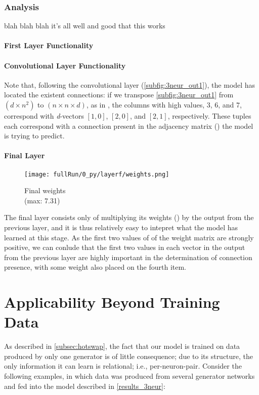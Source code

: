 \subsubsection{Analysis}
blah blah blah it's all well and good that this works

\paragraph{First Layer Functionality}

\paragraph{Convolutional Layer Functionality}

Note that, following the convolutional layer (\ref{subfig:3neur_out1}), the 
model has located the existent connections: if we transpose 
\ref{subfig:3neur_out1} from $(d \times n^2)$ to $(n \times n \times d)$, as in 
, the columns with high values, 3, 6, and 7, correspond 
with \textit{d}-vectors $[1,0]$, $[2,0]$, and $[2,1]$, respectively. These 
tuples each correspond with a connection present in the adjacency matrix 
() the model is trying to predict. 

\paragraph{Final Layer}
\begin{wrapfigure}[5]{r}{.25\textwidth}
	\centering
	\vspace{-15pt}
	\texttt{[image: fullRun/0\_py/layerf/weights.png]}
	\caption{Final weights\\(max: 7.31)}
	\label{fig:3neur_flayer}
\end{wrapfigure}
The final layer consists only of multiplying its weights 
() by the output from the previous layer, and it is 
thus relatively easy to intepret what the model has learned at this stage. As 
the first two values of of the weight matrix are strongly positive, we can 
conlude that the first two values in each vector in the output from the previous 
layer are highly important in the determination of connection presence, with 
some weight also placed on the fourth item.



\section{Applicability Beyond Training Data}
As described in \ref{subsec:hotswap}, the fact that our model is trained on data 
produced by only one generator is of little consequence; due to its structure, 
the only information it can learn is relational; i.e., per-neuron-pair. Consider 
the following examples, in which data was produced from several generator 
networks and fed into the model described in \ref{results_3neur}:


